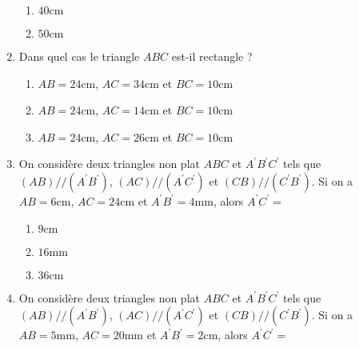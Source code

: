 \documentclass[oneside,twoside]{book}
\begin{document}
\begin{enumerate}
\begin{enumerate}
\item\BonneReponse $40\mathrm{cm}$

\item\MauvaiseReponse $50\mathrm{cm}$

\end{enumerate}



\item Dans quel cas le triangle $ABC$ est-il rectangle ?

\begin{enumerate}


\item\MauvaiseReponse $AB=24\mathrm{cm}$, $AC=34\mathrm{cm}$ et $BC=10\mathrm{cm}$

\item\MauvaiseReponse $AB=24\mathrm{cm}$, $AC=14\mathrm{cm}$ et $BC=10\mathrm{cm}$

\item\BonneReponse $AB=24\mathrm{cm}$, $AC=26\mathrm{cm}$ et $BC=10\mathrm{cm}$

\end{enumerate}



\item On considère deux triangles non plat $ABC$ et $A^\prime B^\prime C^\prime$ tels que $\left(AB\right)//\left(A^{\prime}B^{\prime}\right)$, $\left(AC\right)//\left(A^{\prime}C^{\prime}\right)$ et $\left(CB\right)//\left(C^{\prime}B^{\prime}\right)$. Si on a $AB=6\mathrm{cm}$, $AC=24\mathrm{cm}$ et $A^{\prime}B^{\prime}=4\mathrm{mm}$, alors $A^{\prime}C^{\prime}=$

\begin{enumerate}


\item\MauvaiseReponse $9\mathrm{cm}$

\item\BonneReponse $16\mathrm{mm}$

\item\MauvaiseReponse $36\mathrm{cm}$

\end{enumerate}



\item On considère deux triangles non plat $ABC$ et $A^\prime B^\prime C^\prime$ tels que $\left(AB\right)//\left(A^{\prime}B^{\prime}\right)$, $\left(AC\right)//\left(A^{\prime}C^{\prime}\right)$ et $\left(CB\right)//\left(C^{\prime}B^{\prime}\right)$. Si on a $AB=5\mathrm{mm}$, $AC=20\mathrm{mm}$ et $A^{\prime}B^{\prime}=2\mathrm{cm}$, alors $A^{\prime}C^{\prime}=$


\end{enumerate}
\end{document}
